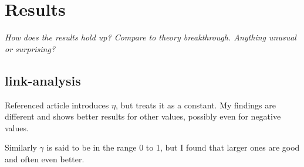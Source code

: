 
\section{Results}\label{sec:disc:results}

\textit{How does the results hold up? Compare to theory breakthrough. Anything unusual or surprising?}

\subsection{link-analysis}

Referenced article introduces $\eta$, but treats it as a constant. My findings are different and shows better results for other values, possibly even for negative values.

Similarly $\gamma$ is said to be in the range 0 to 1, but I found that larger ones are good and often even better.

